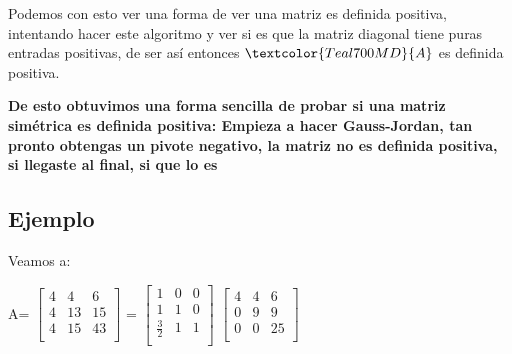 \documentclass[12pt, fleqn]{report}                             %
\def \Eq {equation}                                             %
\newenvironment{MultiLineEquation*}[1]                          %
        {\begin{\Eq*}\begin{alignedat}{#1}}                         %
        {\end{alignedat}\end{\Eq*}}                                 %
\theoremstyle{break}                                            %
\newcommand{\bVector}[1]                                        %
        { \ensuremath{\begin{bmatrix}#1\end{bmatrix}} }             %
\newcommand{\Color}[2]{\textcolor{#1}{#2}}                      %
\newcommand \ColorMatrixA       {Teal700MD}                     %
\newcommand \ColorMatrixL       {Amber700MD}                    %
\newcommand \ColorMatrixU       {Indigo700MD}                   %
\newcommand \MatrixA      {\Color{\ColorMatrixA}{A}}            %
\begin{document}
            Podemos con esto ver una forma de ver una matriz es definida positiva, intentando hacer este algoritmo y ver
            si es que la matriz diagonal tiene puras entradas positivas, de ser así entonces $\MatrixA$ es definida positiva.

                \textbf{De esto obtuvimos una forma sencilla de probar si una matriz simétrica es definida positiva: 
                Empieza a hacer Gauss-Jordan, tan pronto obtengas un pivote negativo, la matriz no es definida positiva,
                si llegaste al final, si que lo es}

            \subsection{Ejemplo}

                Veamos a:
                \begin{MultiLineEquation*}{3}
                    \Color{\ColorMatrixA}{\MatrixA = \bVector{
                        4 &  4 &  6 \\
                        4 & 13 & 15 \\
                        4 & 15 & 43 \\
                    }}
                    =
                    \Color{\ColorMatrixL}{
                        \bVector{
                            1 &  0 & 0 \\
                            1 &  1 & 0 \\
                            \frac{3}{2} &  1 & 1 \\
                        }
                    }
                    \Color{\ColorMatrixU}{
                        \bVector{
                            4 &  4 & 6  \\
                            0 &  9 & 9  \\
                            0 &  0 & 25 \\
                        }
                    }
                \end{MultiLineEquation*}
\end{document}
